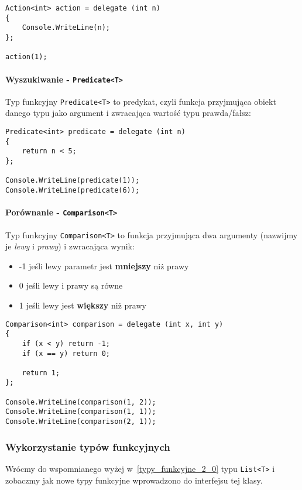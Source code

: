 \begin{scriptsize}
\begin{verbatim}
Action<int> action = delegate (int n)
{
    Console.WriteLine(n);
};

action(1);
\end{verbatim}
\end{scriptsize}

\paragraph{Wyszukiwanie - {\tt Predicate<T>}}

Typ funkcyjny {\tt Predicate<T>} to predykat, czyli funkcja przyjmująca obiekt danego typu jako argument i zwracająca wartość typu prawda/fałsz:

\begin{scriptsize}
\begin{verbatim}
Predicate<int> predicate = delegate (int n)
{
    return n < 5;
};

Console.WriteLine(predicate(1));
Console.WriteLine(predicate(6));
\end{verbatim}
\end{scriptsize}

\paragraph{Porównanie - {\tt Comparison<T>}}

Typ funkcyjny {\tt Comparison<T>} to funkcja przyjmująca dwa argumenty (nazwijmy je {\em lewy} i {\em prawy}) i zwracająca wynik:
\begin{itemize}
\item -1 jeśli lewy parametr jest {\bf mniejszy} niż prawy
\item 0 jeśli lewy i prawy są równe
\item 1 jeśli lewy jest {\bf większy} niż prawy
\end{itemize}

\begin{scriptsize}
\begin{verbatim}
Comparison<int> comparison = delegate (int x, int y)
{
    if (x < y) return -1;
    if (x == y) return 0;

    return 1;
};

Console.WriteLine(comparison(1, 2));
Console.WriteLine(comparison(1, 1));
Console.WriteLine(comparison(2, 1));
\end{verbatim}
\end{scriptsize}

\subsubsection{Wykorzystanie typów funkcyjnych}

Wrócmy do wspomnianego wyżej w~\ref{typy_funkcyjne_2_0} typu {\tt List<T>} i zobaczmy jak nowe typy funkcyjne wprowadzono do interfejsu tej klasy.
